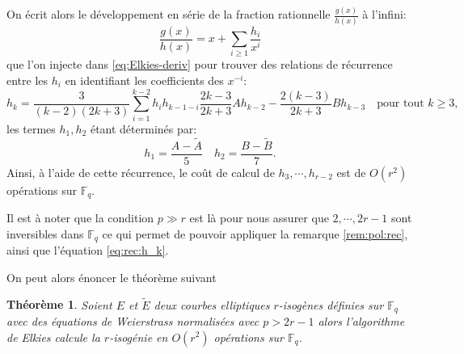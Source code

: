 \documentclass[10pt,a4paper]{book}
\theoremstyle{plain}
\newtheorem{thm}{Théorème}[chapter]
\theoremstyle{definition}
\theoremstyle{definition}
\theoremstyle{definition}
\theoremstyle{definition}
\theoremstyle{remark}
\theoremstyle{remark}
\theoremstyle{definition}
\begin{document}
On écrit alors le développement en série de la fraction rationnelle $\frac{g(x)}{h(x)}$ à l'infini:
\begin{equation}
\label{eq:iso:frac}
\frac{g(x)}{h(x)}=x+ \sum_{i\geqslant 1} \frac{h_i}{x^i}
\end{equation}
que l'on injecte dans \eqref{eq:Elkies-deriv} pour trouver des relations de récurrence entre les $h_i$ en identifiant les coefficients des $x^{-i}$:
\begin{equation}
\label{eq:rec:h_k}
h_k=\frac{3}{(k-2)(2k+3)}\sum_{i=1}^{k-2}h_ih_{k-1-i}\frac{2k-3}{2k+3}Ah_{k-2}-\frac{2(k-3)}{2k+3}Bh_{k-3} \quad \text{pour tout } k \geqslant 3,
\end{equation}
les termes $h_1,h_2$ étant déterminés par:
\begin{equation}
h_1=\frac{A-\tilde{A}}{5} \quad h_2={\frac{B-\tilde{B}}{7}}.
\end{equation}
Ainsi, à l'aide de cette récurrence, le coût de calcul de $h_3, \cdots , h_{r-2}$ est de $O(r^2)$ opérations sur $\mathbb{F}_q$. 

Il est à noter que la condition $p \gg r$ est là pour nous assurer que $2, \cdots, 2r-1$ sont inversibles dans $\mathbb{F}_q$ ce qui permet de pouvoir appliquer la remarque \ref{rem:pol:rec}, ainsi que l'équation \eqref{eq:rec:h_k}.

On peut alors énoncer le théorème suivant
\begin{thm}
Soient $E$ et $\tilde{E}$ deux courbes elliptiques $r$-isogènes définies sur
$\mathbb{F}_q$ avec des équations de Weierstrass normalisées avec $p>2r-1$ 
alors l'algorithme de Elkies calcule la $r$-isogénie en $O(r^2)$ opérations sur
$\mathbb{F}_q$.
\end{thm}
\end{document}
